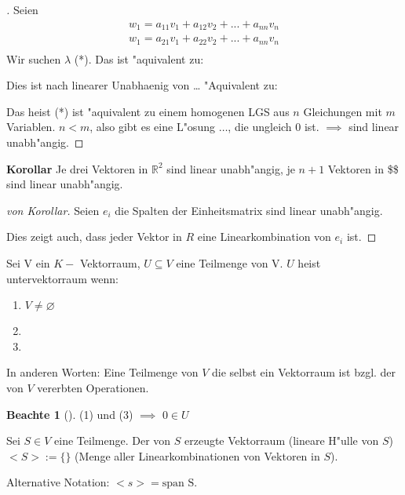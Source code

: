 \documentclass[11pt]{article}
\theoremstyle{remark}
\theoremstyle{definition}
\newtheorem*{notte}{Beachte}
\theoremstyle{remark}
\begin{document}
\begin{proof}[] \label{}
Seien 
\begin{align*}
w_1= a_{11} v_1 + a_{12} v_2 + ... + a_{nn} v_n \\
w_1= a_{21} v_1 + a_{22} v_2 + ... + a_{nn} v_n \\
\end{align*}
Wir suchen \(\lambda\) (*). Das ist "aquivalent zu:

Dies ist nach linearer Unabhaenig von \ldots{} "Aquivalent zu:

Das heist (*) ist "aquivalent zu einem homogenen LGS aus \(n\) Gleichungen mit \(m\)
Variablen. \(n<m\), also gibt es eine L"osung $\ldots{}$, die ungleich \(0\) ist. \(\implies\)
sind linear unabh"angig.
\end{proof}

\textbf{Korollar} Je drei Vektoren in \(\mathbb{R}^2\) sind linear unabh"angig, je \(n+1\)
Vektoren in \$\$ sind linear unabh"angig.

\begin{proof}[von Korollar] \label{}
Seien \(e_i\) die Spalten der Einheitsmatrix sind linear unabh"angig. 

Dies zeigt auch, dass jeder Vektor in \(R\) eine Linearkombination von \(e_i\) ist. 
\end{proof}

\begin{definition}{}{}
Sei V ein \(K-\) Vektorraum, \(U\subseteq V\) eine Teilmenge von V. \(U\) heist
untervektorraum wenn:
\begin{enumerate}
\item \(V\not= \varnothing\)
\item 

\item 
\end{enumerate}

In anderen Worten: Eine Teilmenge von \(V\) die selbst ein Vektorraum ist bzgl.
der von \(V\) vererbten Operationen.
\end{definition}

\begin{notte}[] \label{}
(1) und (3) \(\implies\) \(0\in U\)
\end{notte}

\begin{definition}{}{}
Sei \(S \in V\) eine Teilmenge. Der von \(S\) erzeugte Vektorraum (lineare H"ulle
von \(S\)) \(<S>:=\{\}\) (Menge aller Linearkombinationen von Vektoren in \(S\)).

Alternative Notation: \(<s>=\text{span S}\).
\end{definition}
\end{document}
